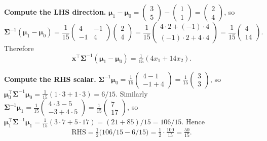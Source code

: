 \documentclass[11pt,a4paper]{article}
\begin{document}
\textbf{Compute the LHS direction.}
$\boldsymbol\mu_1-\boldsymbol\mu_0 = \begin{pmatrix}3\\5\end{pmatrix} - \begin{pmatrix}1\\1\end{pmatrix}
   = \begin{pmatrix}2\\4\end{pmatrix}$, so
$$\boldsymbol\Sigma^{-1}(\boldsymbol\mu_1-\boldsymbol\mu_0)
   = \frac{1}{15}\begin{pmatrix}4 & -1\\-1 & 4\end{pmatrix}\begin{pmatrix}2\\4\end{pmatrix}
   = \frac{1}{15}\begin{pmatrix}4\cdot 2 + (-1)\cdot 4\\(-1)\cdot 2 + 4\cdot 4\end{pmatrix}
   = \frac{1}{15}\begin{pmatrix}4\\14\end{pmatrix}.$$
Therefore
$$\mathbf{x}^\top\boldsymbol\Sigma^{-1}(\boldsymbol\mu_1-\boldsymbol\mu_0)
   = \tfrac{1}{15}(4 x_1 + 14 x_2).$$

\textbf{Compute the RHS scalar.}
$\boldsymbol\Sigma^{-1}\boldsymbol\mu_0
   = \tfrac{1}{15}\begin{pmatrix}4-1\\-1+4\end{pmatrix} = \tfrac{1}{15}\begin{pmatrix}3\\3\end{pmatrix}$,
so $\boldsymbol\mu_0^\top\boldsymbol\Sigma^{-1}\boldsymbol\mu_0 = \tfrac{1}{15}(1\cdot 3 + 1\cdot 3) = 6/15$.
Similarly
$\boldsymbol\Sigma^{-1}\boldsymbol\mu_1
   = \tfrac{1}{15}\begin{pmatrix}4\cdot 3 - 5\\-3 + 4\cdot 5\end{pmatrix} = \tfrac{1}{15}\begin{pmatrix}7\\17\end{pmatrix}$,
so $\boldsymbol\mu_1^\top\boldsymbol\Sigma^{-1}\boldsymbol\mu_1 = \tfrac{1}{15}(3\cdot 7 + 5\cdot 17) = (21+85)/15 = 106/15$.
Hence
$$\text{RHS} = \tfrac{1}{2}\bigl(106/15 - 6/15\bigr) = \tfrac{1}{2}\cdot\tfrac{100}{15} = \tfrac{50}{15}.$$
\end{document}
